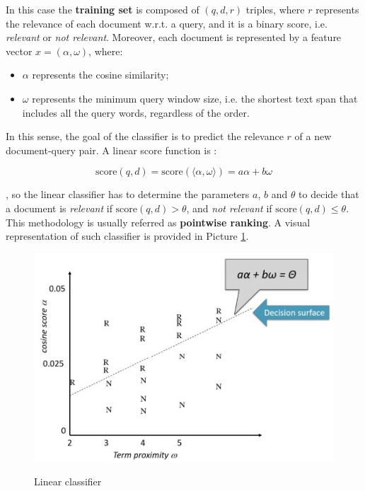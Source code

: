 In this case the \textbf{training set} is composed of $(q,d,r)$ triples, where $r$ represents the relevance of each document w.r.t. a query, and it is a binary score, i.e. \textit{relevant} or \textit{not relevant}. Moreover, each document is represented by a feature vector $x = (\alpha, \omega)$, where:

\begin{itemize}
    \item $\alpha$ represents the cosine similarity;
    \item $\omega$ represents the minimum query window size, i.e. the shortest text span that includes all the query words, regardless of the order.
\end{itemize}

In this sense, the goal of the classifier is to predict the relevance $r$ of a new document-query pair. A linear score function is :

$$
\text{score}(q,d) = \text{score}(\langle \alpha,\omega \rangle) = a\alpha + b\omega
$$

, so the linear classifier has to determine the parameters $a$, $b$ and $\theta$ to decide that a document is \textit{relevant} if $\text{score}(q,d) > \theta$, and \textit{not relevant} if $\text{score}(q,d) \leq \theta$. This methodology is usually referred as \textbf{pointwise ranking}. A visual representation of such classifier is provided in Picture \ref{class rank}.

\begin{figure}[h!]
		\centering
        \includegraphics[scale = 1.8]{img/classification ranking.jpg}
		\label{class rank}
        \caption{Linear classifier}
\end{figure}


